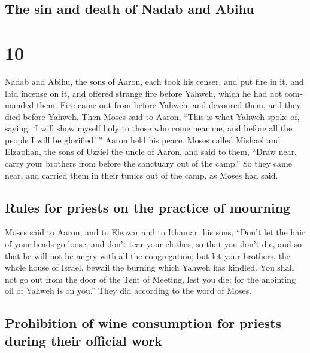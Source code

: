 \begin{paracol}{2}
\begin{otherlanguage}{english}
\hypertarget{the-sin-and-death-of-nadab-and-abihu}{%
\subsection{The sin and death of Nadab and
Abihu}\label{the-sin-and-death-of-nadab-and-abihu}}

\hypertarget{section-19}{%
\section{10}\label{section-19}}

 Nadab and Abihu, the sons of Aaron, each took his censer,
and put fire in it, and laid incense on it, and offered strange fire
before Yahweh, which he had not commanded them.  Fire came
out from before Yahweh, and devoured them, and they died before Yahweh.
 Then Moses said to Aaron, ``This is what Yahweh spoke of,
saying, `I will show myself holy to those who come near me, and before
all the people I will be glorified.'\,'' Aaron held his peace.
 Moses called Mishael and Elzaphan, the sons of Uzziel the
uncle of Aaron, and said to them, ``Draw near, carry your brothers from
before the sanctuary out of the camp.''  So they came
near, and carried them in their tunics out of the camp, as Moses had
said.

\hypertarget{rules-for-priests-on-the-practice-of-mourning}{%
\subsection{Rules for priests on the practice of
mourning}\label{rules-for-priests-on-the-practice-of-mourning}}

 Moses said to Aaron, and to Eleazar and to Ithamar, his
sons, ``Don't let the hair of your heads go loose, and don't tear your
clothes, so that you don't die, and so that he will not be angry with
all the congregation; but let your brothers, the whole house of Israel,
bewail the burning which Yahweh has kindled.  You shall
not go out from the door of the Tent of Meeting, lest you die; for the
anointing oil of Yahweh is on you.'' They did according to the word of
Moses.

\hypertarget{prohibition-of-wine-consumption-for-priests-during-their-official-work}{%
\subsection{Prohibition of wine consumption for priests during their
official
work}\label{prohibition-of-wine-consumption-for-priests-during-their-official-work}}


\end{otherlanguage}
\end{paracol}
